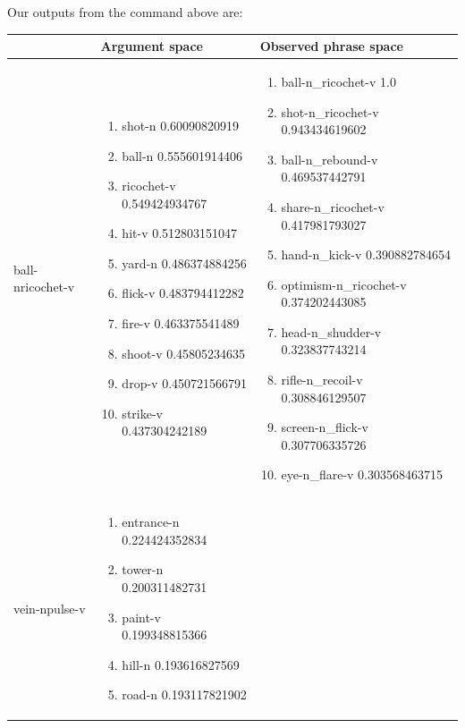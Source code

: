 \documentclass[12pt]{article}
\begin{document}
Our outputs from the command above are:
\begin{longtable}{ p{2cm} | p{5cm} | p{5cm} }
	& \textbf{Argument space} & \textbf{Observed phrase space}\\
	\hline
	ball-n\newline ricochet-v &
	\begin{enumerate}
		\item shot-n 0.60090820919
        \item ball-n 0.555601914406
        \item ricochet-v 0.549424934767
        \item hit-v 0.512803151047
        \item yard-n 0.486374884256
        \item flick-v 0.483794412282
        \item fire-v 0.463375541489
        \item shoot-v 0.45805234635
        \item drop-v 0.450721566791
        \item strike-v 0.437304242189
	\end{enumerate}
	&
	\begin{enumerate}
		\item ball-n\_ricochet-v 1.0
		\item shot-n\_ricochet-v 0.943434619602
		\item ball-n\_rebound-v 0.469537442791
		\item share-n\_ricochet-v 0.417981793027
		\item hand-n\_kick-v 0.390882784654
		\item optimism-n\_ricochet-v 0.374202443085
		\item head-n\_shudder-v 0.323837743214
		\item rifle-n\_recoil-v 0.308846129507
		\item screen-n\_flick-v 0.307706335726
		\item eye-n\_flare-v 0.303568463715
	\end{enumerate}
	\\
	vein-n\newline pulse-v &
	\begin{enumerate}
		\item entrance-n 0.224424352834
		\item tower-n 0.200311482731
		\item paint-v 0.199348815366
		\item hill-n 0.193616827569
		\item road-n 0.193117821902

\end{enumerate}
\end{longtable}
\end{document}
